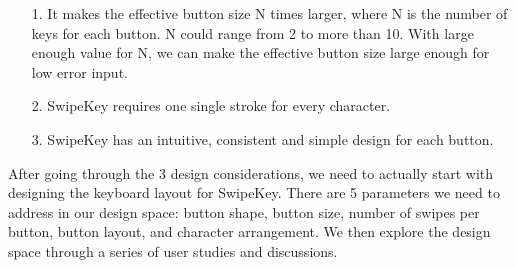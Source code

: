     \begin{itemize}
    \item[1.]It makes the effective button size N times larger, where N is the number of keys for each button. N could range from 2 to more than 10. With large enough value for N, we can make the effective button size large enough for low error input.
    \item[2.]SwipeKey requires one single stroke for every character.
    \item[3.]SwipeKey has an intuitive, consistent and simple design for each button.
    \end{itemize}
    
After going through the 3 design considerations, we need to actually start with designing the keyboard layout for SwipeKey. There are 5 parameters we need to address in our design space: button shape, button size, number of swipes per button, button layout, and character arrangement. We then explore the design space through a series of user studies and discussions.